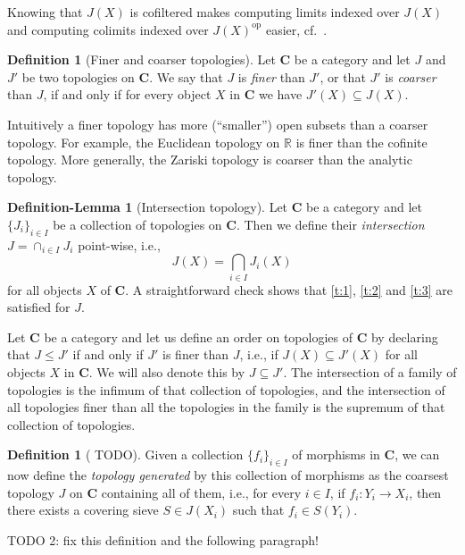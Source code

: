 \documentclass[12pt,reqno,a4paper]{amsart}
\theoremstyle{plain}
\theoremstyle{definition}
\newtheorem{defn}[thm]{Definition}
\newtheorem{defnlm}[thm]{Definition-Lemma}
\theoremstyle{remark}
\begin{document}
Knowing that $J(X)$ is cofiltered makes computing limits indexed over $J(X)$ and computing colimits indexed over $J(X)^{\mathrm{op}}$ easier, cf.~\cite[\href{https://stacks.math.columbia.edu/tag/04AX}{Tag 04AX}]{stacks-project}.

\begin{defn}[Finer and coarser topologies]
  Let $\mathbf{C}$ be a category and let $J$ and $J'$ be two topologies on $\mathbf{C}$.
  We say that $J$ is \textit{finer} than $J'$, or that $J'$ is \textit{coarser} than $J$, if and only if for every object $X$ in $\mathbf{C}$ we have $J'(X) \subseteq J(X)$.
\end{defn}

Intuitively a finer topology has more (``smaller'') open subsets than a coarser topology.
For example, the Euclidean topology on $\mathbb{R}$ is finer than the cofinite topology.
More generally, the Zariski topology is coarser than the analytic topology.

\begin{defnlm}[Intersection topology]\label{defnlm:intersection}
  Let $\mathbf{C}$ be a category and let $\{ J_{i} \}_{i \in I}$ be a collection of topologies on $\mathbf{C}$.
  Then we define their \textit{intersection} $J = \cap_{i \in I} J_{i}$ point-wise, i.e.,
  \[ J(X) = \bigcap_{i \in I} J_{i}(X) \]
  for all objects $X$ of $\mathbf{C}$.
  A straightforward check shows that \ref{t:1}, \ref{t:2} and \ref{t:3} are satisfied for $J$.
\end{defnlm}

Let $\mathbf{C}$ be a category and let us define an order on topologies of $\mathbf{C}$ by declaring that $J \leq J'$ if and only if $J'$ is finer than $J$, i.e., if $J(X) \subseteq J'(X)$ for all objects $X$ in $\mathbf{C}$.
We will also denote this by $J \subseteq J'$.
The intersection of a family of topologies is the infimum of that collection of topologies, and the intersection of all topologies finer than all the topologies in the family is the supremum of that collection of topologies.

\begin{defn}[{\color{red} TODO}]\label{defn:generated}
  Given a collection $\{ f_{i} \}_{i \in I}$ of morphisms in $\mathbf{C}$, we can now define the \textit{topology generated} by this collection of morphisms as the coarsest topology $J$ on $\mathbf{C}$ containing all of them, i.e., for every $i \in I$, if $f_{i} \colon Y_{i} \to X_{i}$, then there exists a covering sieve $S \in J(X_{i})$ such that $f_{i} \in S(Y_{i})$.

  {\color{red} TODO 2: fix this definition and the following paragraph!}
\end{defn}
\end{document}
